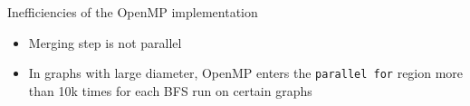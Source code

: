 









\begin{frame}{Inefficiencies of the OpenMP implementation}
  \begin{itemize}
    \item Merging step is not parallel
    \pause
    \item In graphs with large diameter, OpenMP enters the \texttt{parallel for} region more than 10k times for each BFS run on certain graphs
  \end{itemize}
\end{frame}